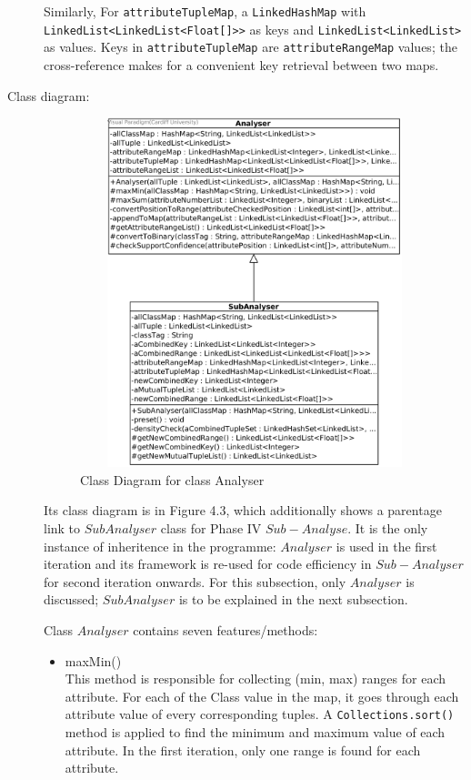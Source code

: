 \begin{description}
Similarly, For \texttt{attributeTupleMap}, a \texttt{LinkedHashMap} with \texttt{LinkedList<LinkedList<Float[]>>} as keys and \texttt{LinkedList<LinkedList>} as values. Keys in \texttt{attributeTupleMap} are \texttt{attributeRangeMap} values; the cross-reference makes for a convenient key retrieval between two maps. 

\item[Class diagram: ] 

\begin{figure}[h]
    \centering
    \includegraphics[width=4.5in, height=4in]{figures/class_analyser}
    \caption[Class Diagram for class Analyser]{Class Diagram for class Analyser}
    \label{fig:figure4_3}
\end{figure}

Its class diagram is in Figure 4.3, which additionally shows a parentage link to $SubAnalyser$ class for Phase IV $Sub-Analyse$. It is the only instance of inheritence in the programme: $Analyser$ is used in the first iteration and its framework is re-used for code efficiency in $Sub-Analyser$ for second iteration onwards. For this subsection, only $Analyser$ is discussed; $SubAnalyser$ is to be explained in the next subsection.

Class $Analyser$ contains seven features/methods:

\begin{itemize}
	\item{maxMin()} \\
	This method is responsible for collecting (min, max) ranges for each attribute. For each of the Class value in the map, it goes through each attribute value of every corresponding tuples. A \texttt{Collections.sort()} method is applied to find the minimum and maximum value of each attribute. In the first iteration, only one range is found for each attribute.
	

\end{itemize}
\end{description}
